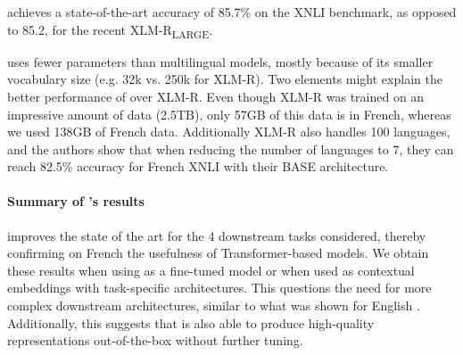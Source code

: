 \camembertccnetlarge achieves a state-of-the-art accuracy of 85.7\% on the XNLI benchmark, as opposed to 85.2, for the recent XLM-R\textsubscript{LARGE}.

\camembert uses fewer parameters than multilingual models, mostly because of its smaller vocabulary size (e.g. 32k vs. 250k for XLM-R).
Two elements might explain the better performance of \camembert over XLM-R.
Even though XLM-R was trained on an impressive amount of data (2.5TB), only 57GB of this data is in French, whereas we used 138GB of French data.
Additionally XLM-R also handles 100 languages, and the authors show that when reducing the number of languages to 7, they can reach 82.5\% accuracy for French XNLI with their BASE architecture.



\paragraph{Summary of \camembert's results}
\camembert improves the state of the art for the 4 downstream tasks considered, thereby confirming on French the usefulness of Transformer-based models. We obtain these results when using \camembert as a fine-tuned model or when used as contextual embeddings with task-specific architectures.
This questions the need for more complex downstream architectures, similar to what was shown for English \cite{devlin-etal-2019-bert}.
Additionally, this suggests that \camembert is also able to produce high-quality representations out-of-the-box without further tuning.

